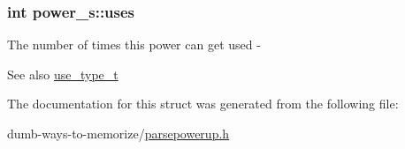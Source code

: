 \subsubsection[{\texorpdfstring{uses}{uses}}]{\setlength{\rightskip}{0pt plus 5cm}int power\+\_\+s\+::uses}\hypertarget{structpower__s_a310abaa0adf5658783bcab8845a9a026}{}\label{structpower__s_a310abaa0adf5658783bcab8845a9a026}
The number of times this power can get used -\/ \begin{DoxySeeAlso}{See also}
\hyperlink{parsepowerup_8h_a2231c1a21540cc394825ca5e5df7cab4}{use\+\_\+type\+\_\+t} 
\end{DoxySeeAlso}


The documentation for this struct was generated from the following file\+:\begin{DoxyCompactItemize}
\item 
dumb-\/ways-\/to-\/memorize/\hyperlink{parsepowerup_8h}{parsepowerup.\+h}\end{DoxyCompactItemize}
